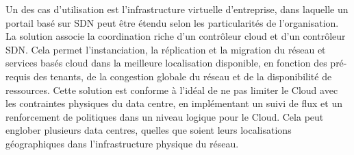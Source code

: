 Un des cas d'utilisation est l'infrastructure virtuelle d'entreprise, dans laquelle un portail basé sur SDN peut être étendu selon les particularités de l'organisation. La solution associe la coordination riche d'un contrôleur cloud et d'un contrôleur SDN. Cela permet l'instanciation, la réplication et la migration du réseau et services basés cloud dans la meilleure localisation disponible, en fonction des pré-requis des tenants, de la congestion globale du réseau et de la disponibilité de ressources. Cette solution est conforme à l'idéal de ne pas limiter le Cloud avec les contraintes physiques du data centre, en implémentant un suivi de flux et un renforcement de politiques dans un niveau logique pour le Cloud. Cela peut englober plusieurs data centres, quelles que soient leurs localisations géographiques dans l'infrastructure physique du réseau.





